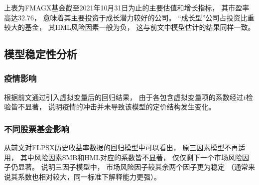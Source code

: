 \documentclass[UTF8]{ctexart}
\begin{document}
上表为FMAGX基金截至2021年10月31日为止的主要估值和增长指标，
其市盈率高达32.76，
意味着其主要投资于成长潜力较好的公司。
“成长型”公司占投资比重较大的基金，
其HML风险因素一般为负，
这与前文中模型估计的结果同样一致。

\subsection{模型稳定性分析}

\subsubsection{疫情影响}
根据前文通过引入虚拟变量后的回归结果，
由于各包含虚拟变量项的系数经过$t$检验皆不显著，
说明疫情的冲击并未导致该模型的定价结构发生变化。

\subsubsection{不同股票基金影响}
从前文对FLPSX历史收益率数据的回归模型中可以看出，
原三因素模型不再适用，
其中风险因素SMB和HML对应的系数皆不显著，
仅仅剩下一个市场风险因子仍显著。
说明三因子模型中，
市场风险因子较其余两个因子更为稳定
（通常来说其系数也相对较大，同一标准下解释能力更强）。
\end{document}
